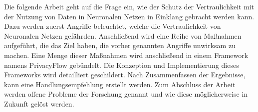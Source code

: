 Die folgende Arbeit geht auf die Frage ein, wie der Schutz der Vertraulichkeit mit der Nutzung von Daten in Neuronalen Netzen in Einklang gebracht werden kann.
Dazu werden zuerst Angriffe beleuchtet, welche die Vertraulichkeit von Neuronalen Netzen gefährden.
Anschließend wird eine Reihe von Maßnahmen aufgeführt, die das Ziel haben, die vorher genannten Angriffe unwirksam zu machen.
Eine Menge dieser Maßnahmen wird anschließend in einem Framework namens PrivacyFlow gebündelt.
Die Konzeption und Implementierung dieses Frameworks wird detailliert geschildert.
Nach Zusammenfassen der Ergebnisse, kann eine Handlungsempfehlung erstellt werden.
Zum Abschluss der Arbeit werden offene Probleme der Forschung genannt und wie diese möglicherweise in Zukunft gelöst werden.
